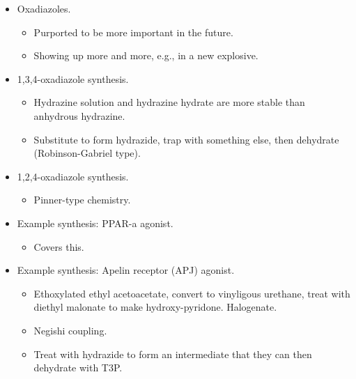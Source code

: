 \documentclass[../notes.tex]{subfiles}
\begin{document}
\begin{itemize}
    \item Oxadiazoles.
    \begin{itemize}
        \item Purported to be more important in the future.
        \item Showing up more and more, e.g., in a new explosive.
    \end{itemize}
    \item 1,3,4-oxadiazole synthesis.
    \begin{itemize}
        \item Hydrazine solution and hydrazine hydrate are more stable than anhydrous hydrazine.
        \item Substitute to form hydrazide, trap with something else, then dehydrate (Robinson-Gabriel type).
    \end{itemize}
    \item 1,2,4-oxadiazole synthesis.
    \begin{itemize}
        \item Pinner-type chemistry.
    \end{itemize}
    \item Example synthesis: PPAR-a agonist.
    \begin{itemize}
        \item Covers this.
    \end{itemize}
    \item Example synthesis: Apelin receptor (APJ) agonist.
    \begin{itemize}
        \item Ethoxylated ethyl acetoacetate, convert to vinyligous urethane, treat with diethyl malonate to make hydroxy-pyridone. Halogenate.
        \item Negishi coupling.
        \item Treat with hydrazide to form an intermediate that they can then dehydrate with T3P.
    \end{itemize}
\end{itemize}
\end{document}
